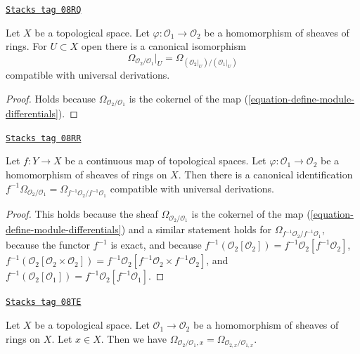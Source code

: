 \begin{lemma}
\label{modules-lemma-localize-differentials}
\href{https://stacks.math.columbia.edu/tag/08RQ}{\texttt{Stacks tag 08RQ}}

Let $X$ be a topological space. Let $\varphi : \mathcal{O}_1 \to \mathcal{O}_2$
be a homomorphism of sheaves of rings. For $U \subset X$ open
there is a canonical isomorphism
$$
\Omega_{\mathcal{O}_2/\mathcal{O}_1}|_U =
\Omega_{(\mathcal{O}_2|_U)/(\mathcal{O}_1|_U)}
$$
compatible with universal derivations.
\end{lemma}

\begin{proof}
Holds because $\Omega_{\mathcal{O}_2/\mathcal{O}_1}$
is the cokernel of the map (\ref{equation-define-module-differentials}).
\end{proof}

\begin{lemma}
\label{modules-lemma-pullback-differentials}
\href{https://stacks.math.columbia.edu/tag/08RR}{\texttt{Stacks tag 08RR}}

Let $f : Y \to X$ be a continuous map of topological spaces.
Let $\varphi : \mathcal{O}_1 \to \mathcal{O}_2$
be a homomorphism of sheaves of rings on $X$.
Then there is a canonical identification
$f^{-1}\Omega_{\mathcal{O}_2/\mathcal{O}_1} =
\Omega_{f^{-1}\mathcal{O}_2/f^{-1}\mathcal{O}_1}$
compatible with universal derivations.
\end{lemma}

\begin{proof}
This holds because the sheaf $\Omega_{\mathcal{O}_2/\mathcal{O}_1}$
is the cokernel of the map (\ref{equation-define-module-differentials})
and a similar statement holds for
$\Omega_{f^{-1}\mathcal{O}_2/f^{-1}\mathcal{O}_1}$,
because the functor $f^{-1}$ is exact, and because
$f^{-1}(\mathcal{O}_2[\mathcal{O}_2]) =
f^{-1}\mathcal{O}_2[f^{-1}\mathcal{O}_2]$,
$f^{-1}(\mathcal{O}_2[\mathcal{O}_2 \times \mathcal{O}_2]) =
f^{-1}\mathcal{O}_2[f^{-1}\mathcal{O}_2 \times f^{-1}\mathcal{O}_2]$, and
$f^{-1}(\mathcal{O}_2[\mathcal{O}_1]) =
f^{-1}\mathcal{O}_2[f^{-1}\mathcal{O}_1]$.
\end{proof}

\begin{lemma}
\label{modules-lemma-stalk-module-differentials}
\href{https://stacks.math.columbia.edu/tag/08TE}{\texttt{Stacks tag 08TE}}

Let $X$ be a topological space. Let $\mathcal{O}_1 \to \mathcal{O}_2$
be a homomorphism of sheaves of rings on $X$. Let $x \in X$. Then we have
$\Omega_{\mathcal{O}_2/\mathcal{O}_1, x} =
\Omega_{\mathcal{O}_{2, x}/\mathcal{O}_{1, x}}$.
\end{lemma}

